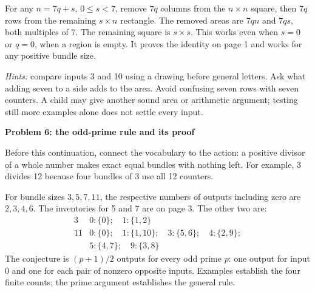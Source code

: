 \documentclass[11pt]{article}
\newcommand{\head}[1]{\par\textbf{\large #1}\par}
\begin{document}
For any $n=7q+s$, $0\le s<7$, remove $7q$ columns from the $n\times n$ square, then $7q$ rows from the remaining $s\times n$ rectangle. The removed areas are $7qn$ and $7qs$, both multiples of 7. The remaining square is $s\times s$. This works even when $s=0$ or $q=0$, when a region is empty. It proves the identity on page 1 and works for any positive bundle size.

\emph{Hints:} compare inputs 3 and 10 using a drawing before general letters. Ask what adding seven to a side adds to the area. Avoid confusing seven rows with seven counters. A child may give another sound area or arithmetic argument; testing still more examples alone does not settle every input.
\newpage
\head{Problem 6: the odd-prime rule and its proof}
Before this continuation, connect the vocabulary to the action: a positive divisor of a whole number makes exact equal bundles with nothing left. For example, 3 divides 12 because four bundles of 3 use all 12 counters.

For bundle sizes $3,5,7,11$, the respective numbers of outputs including zero are $2,3,4,6$. The inventories for 5 and 7 are on page 3. The other two are:
\[
\begin{array}{c|l}
3&0:\{0\};\quad1:\{1,2\}\\[3pt]
11&0:\{0\};\quad1:\{1,10\};\quad3:\{5,6\};\quad4:\{2,9\};\\
&5:\{4,7\};\quad9:\{3,8\}
\end{array}
\]
The conjecture is $(p+1)/2$ outputs for every odd prime $p$: one output for input 0 and one for each pair of nonzero opposite inputs. Examples establish the four finite counts; the prime argument establishes the general rule.
\end{document}
